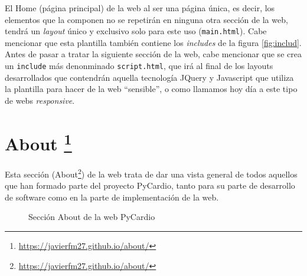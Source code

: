 El Home (página principal) de la web al ser una página única, es decir, los elementos que la componen no se repetirán en ninguna otra sección de la web, tendrá un \emph{layout} único y exclusivo solo para este uso (\texttt{main.html}). Cabe mencionar que esta plantilla también contiene los \emph{includes} de la figura \ref{fig:includ}. \\ 
Antes de pasar a tratar la siguiente sección de la web, cabe mencionar que se crea un \texttt{include} más denonminado \texttt{script.html}, que irá al final de los layouts desarrollados que contendrán aquella tecnología JQuery y Javascript que utiliza la plantilla para hacer de la web   ``sensible'', o como llamamos hoy  día a este tipo de webs \textit{responsive}.
\section[About]{About \footnote{\url{https://javierfm27.github.io/about/}}}
\label{sec:aboutWeb}
Esta sección (About\footnote{\url{https://javierfm27.github.io/about/}}) de la web trata de dar una vista general de todos aquellos que han formado parte del proyecto PyCardio, tanto para su parte de desarrollo de software como en la parte de implementación de la web. 

\begin{figure}[H]
    \centering
    \caption{Sección About de la web PyCardio}
    \label{fig:aboutWeb}
\end{figure}

